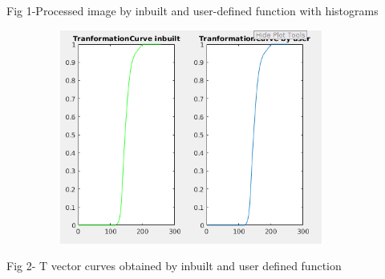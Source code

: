 \documentclass[12pt]{article}
\begin{document}

\par

\begin{adjustwidth}{1.0in}{0.0in}
\begin{Center}
Fig 1-Processed image by inbuilt and user-defined function with histograms
\end{Center}\par

\end{adjustwidth}


\vspace{\baselineskip}



\begin{figure}[H]
	\begin{Center}
		\includegraphics[width=3.96in,height=2.77in]{./media/image15.png}
	\end{Center}
\end{figure}



\begin{adjustwidth}{1.0in}{0.0in}
\begin{Center}
 
\end{Center}\par

\end{adjustwidth}

\begin{adjustwidth}{1.0in}{0.0in}
\begin{Center}
Fig 2- T vector curves obtained by inbuilt and user defined function
\end{Center}\par

\end{adjustwidth}
\end{document}
